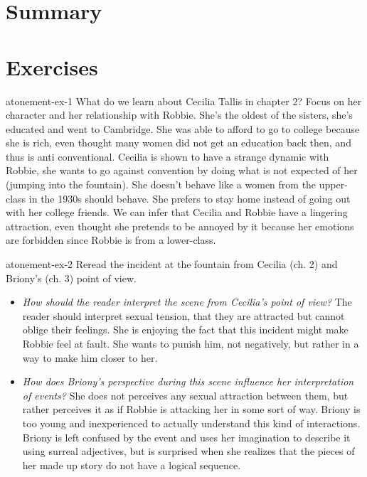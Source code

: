 \documentclass[preview]{standalone}
\begin{document}
\genpage

\section{Summary}

\section{Exercises}

\begin{snippetexercise}{atonement-ex-1}%
{What do we learn about Cecilia Tallis in chapter 2? Focus on her character and her relationship
with Robbie.}
    She's the oldest of the sisters, she's educated and went to Cambridge.
    She was able to afford to go to college because she is rich, even thought many women
    did not get an education back then, and thus is anti conventional.
    Cecilia is shown to have a strange dynamic with Robbie, she wants to go against convention
    by doing what is not expected of her (jumping into the fountain).
    She doesn't behave like a women from the upper-class in the 1930s should behave.
    She prefers to stay home instead of going out with her college friends.
    We can infer that Cecilia and Robbie have a lingering attraction, even thought she
    pretends to be annoyed by it because her emotions are forbidden since Robbie is from a lower-class.
\end{snippetexercise}

\begin{snippetexercise}{atonement-ex-2}%
{Reread the incident at the fountain from Cecilia (ch. 2) and Briony's (ch. 3) point of view.}
    \begin{itemize}
        \item \textit{How should the reader interpret the scene from Cecilia's point of view?}
            The reader should interpret sexual tension, that they are attracted but cannot
            oblige their feelings. She is enjoying the fact
            that this incident might make Robbie feel at fault.
            She wants to punish him, not negatively, but rather in a way to
            make him closer to her.
        \item \textit{How does Briony's perspective during this scene influence her interpretation of events?}
            She does not perceives any sexual attraction between them,
            but rather perceives it as if Robbie is attacking her in some sort of way.
            Briony is too young and inexperienced to actually understand this kind of
            interactions. Briony is left confused by the event and uses
            her imagination to describe it using surreal adjectives, but is surprised
            when she realizes that the pieces of her made up story do not have a logical sequence.
    \end{itemize}
\end{snippetexercise}
\end{document}
